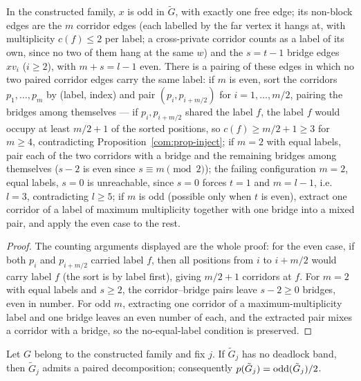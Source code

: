 \begin{lemma}\label{com:lem-offset}
In the constructed family, $x$ is odd in $\tilde G$, with exactly one
free edge; its non-block edges are the $m$ corridor edges (each labelled
by the far vertex it hangs at, with multiplicity $c(f)\le2$ per label; a
cross-private corridor counts as a label of its own, since no two of them
hang at the same $w$) and the $s=t-1$ bridge edges $xv_i$ ($i\ge2$), with
$m+s=l-1$ even. There is a pairing of these edges in which no two paired
corridor edges carry the same label:
if $m$ is even, sort the corridors $p_1,\dots,p_m$ by (label, index) and
pair $(p_i,p_{i+m/2})$ for $i=1,\dots,m/2$, pairing the bridges among
themselves --- if $p_i,p_{i+m/2}$ shared the label $f$, the label $f$
would occupy at least $m/2+1$ of the sorted positions, so
$c(f)\ge m/2+1\ge3$ for $m\ge4$, contradicting
Proposition~\ref{com:prop-inject};
if $m=2$ with equal labels, pair each of the two corridors with a bridge
and the remaining bridges among themselves ($s-2$ is even since
$s\equiv m\pmod2$); the failing configuration $m=2$, equal labels, $s=0$
is unreachable, since $s=0$ forces $t=1$ and $m=l-1$, i.e.\ $l=3$,
contradicting $l\ge5$;
if $m$ is odd (possible only when $t$ is even), extract one corridor of a
label of maximum multiplicity together with one bridge into a mixed pair,
and apply the even case to the rest.
\end{lemma}

\begin{proof}
The counting arguments displayed are the whole proof: for the even case,
if both $p_i$ and $p_{i+m/2}$ carried label $f$, then all positions from
$i$ to $i+m/2$ would carry label $f$ (the sort is by label first), giving
$m/2+1$ corridors at $f$. For $m=2$ with equal labels and $s\ge2$, the
corridor--bridge pairs leave $s-2\ge0$ bridges, even in number. For odd
$m$, extracting one corridor of a maximum-multiplicity label and one
bridge leaves an even number of each, and the extracted pair mixes a
corridor with a bridge, so the no-equal-label condition is preserved.
\end{proof}

\begin{theorem}
\label{com:thm-bandfree}
Let $G$ belong to the constructed family and fix $j$. If $\tilde G_j$ has
no deadlock band, then $\tilde G_j$ admits a paired decomposition;
consequently $p(\tilde G_j)=\mathrm{odd}(\tilde G_j)/2$.
\end{theorem}

